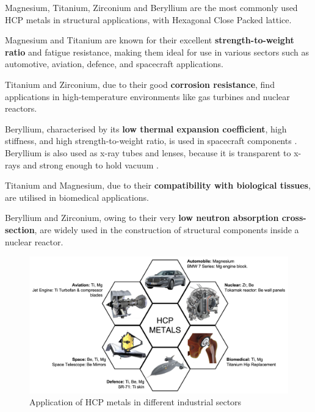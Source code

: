 Magnesium, Titanium, Zirconium and Beryllium are the most commonly used HCP metals in structural applications, with Hexagonal Close Packed lattice.

\vspace{3mm}
Magnesium and Titanium are known for their excellent \textbf{strength-to-weight ratio} and fatigue resistance, making them ideal for use in various sectors such as automotive, aviation, defence, and spacecraft applications\cite{app11156861}. 

\vspace{3mm}
Titanium and Zirconium, due to their good \textbf{corrosion resistance}, find applications in high-temperature environments like gas turbines and nuclear reactors.

\vspace{3mm}
Beryllium, characterised by its \textbf{low thermal expansion coefficient}, high stiffness, and high strength-to-weight ratio, is used in spacecraft components \cite{Feinberg10.1117/12.924271}. Beryllium is also used as x-ray tubes and lenses, because it is transparent to x-rays and strong enough to hold vacuum \cite{rogers1947high}.

\vspace{3mm}
Titanium and Magnesium, due to their \textbf{compatibility with biological tissues}, are utilised in biomedical applications.

\vspace{3mm}
Beryllium and Zirconium, owing to their very \textbf{low neutron absorption cross-section}, are widely used in the construction of structural components inside a nuclear reactor\cite{Tomberlin_osti_910826}.

\begin{figure}[H]
  \centering
  \includegraphics[width=\textwidth]{images/HCP_metals.png}
  \caption{Application of HCP metals in different industrial sectors}
\end{figure}

